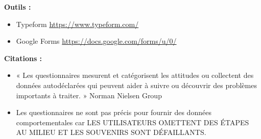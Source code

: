 \textbf{Outils :}

\begin{itemize}
\item Typeform \url{https://www.typeform.com/}
\item Google Forms \url{https://docs.google.com/forms/u/0/}
\end{itemize}

\textbf{Citations :}

\begin{itemize}
\item « Les questionnaires mesurent et catégorisent les attitudes ou collectent des données autodéclarées qui peuvent aider à suivre ou découvrir des problèmes importants à traiter. » Norman Nielsen Group
\item Les questionnaires ne sont pas précis pour fournir des données comportementales car LES UTILISATEURS OMETTENT DES ÉTAPES AU MILIEU ET LES SOUVENIRS SONT DÉFAILLANTS.
\end{itemize}

